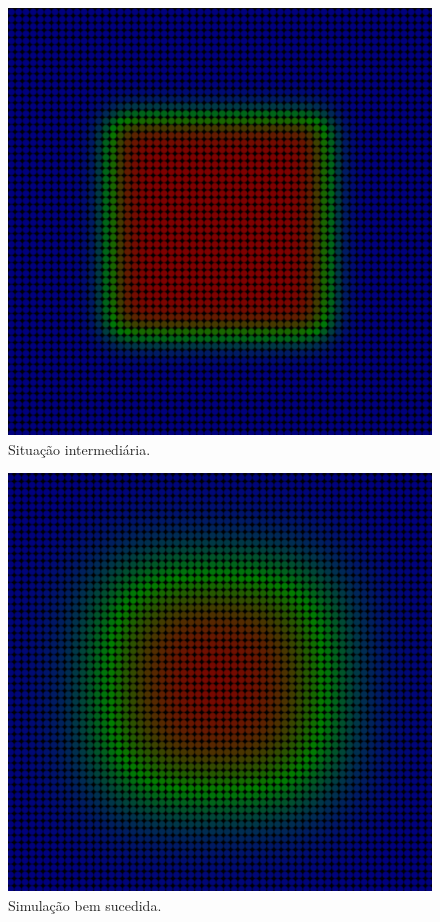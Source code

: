 \documentclass[xcolor=dvipsnames,10pt,aspectratio=169]{beamer}
\begin{document}
\begin{frame}
\begin{minipage}[h!]{0.30\textwidth}
\begin{figure}[h!]
			\includegraphics[trim = {1cm 1cm 1cm 1cm}, clip , angle=0, scale=0.3]{sucesso_2}
			\caption{Situação intermediária.}
		\end{figure}
	\end{minipage}
\begin{minipage}[h!]{0.30\textwidth}
	\begin{figure}[h!]
		\centering
		\includegraphics[trim = {1cm 1cm 1cm 1cm}, clip , angle=0, scale=0.3]{sucesso_3}
		\caption{Simulação bem sucedida.}
	\end{figure}
\end{minipage}
	\end{frame}
\end{document}
